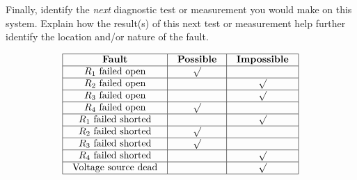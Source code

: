 Finally, identify the {\it next} diagnostic test or measurement you would make on this system.  Explain how the result(s) of this next test or measurement help further identify the location and/or nature of the fault.

\vfil 

\eject







$$\vbox{\offinterlineskip
\halign{\strut
\vrule \quad\hfil # \ \hfil & 
\vrule \quad\hfil # \ \hfil & 
\vrule \quad\hfil # \ \hfil \vrule \cr
\noalign{\hrule}
%
{\bf Fault} & {\bf Possible} & {\bf Impossible} \cr
%
\noalign{\hrule}
%
$R_1$ failed open & $\surd$ &  \cr
%
\noalign{\hrule}
%
$R_2$ failed open &  & $\surd$ \cr
%
\noalign{\hrule}
%
$R_3$ failed open &  & $\surd$ \cr
%
\noalign{\hrule}
%
$R_4$ failed open & $\surd$ &  \cr
%
\noalign{\hrule}
%
$R_1$ failed shorted &  & $\surd$ \cr
%
\noalign{\hrule}
%
$R_2$ failed shorted & $\surd$ &  \cr
%
\noalign{\hrule}
%
$R_3$ failed shorted & $\surd$ &  \cr
%
\noalign{\hrule}
%
$R_4$ failed shorted &  & $\surd$ \cr
%
\noalign{\hrule}
%
Voltage source dead &  & $\surd$ \cr
%
\noalign{\hrule}
} %
}$$ %











